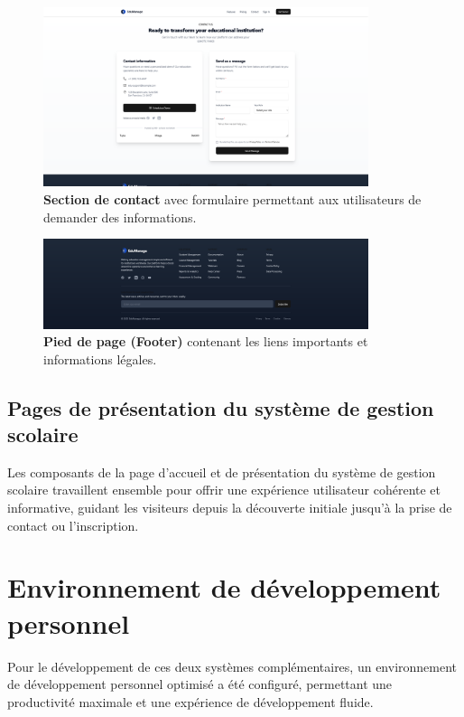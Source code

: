 \begin{figure}[H]
  \centering
  \includegraphics[width=0.85\textwidth,keepaspectratio]{pfe-pics/landing/contact.png}
  \caption{\textbf{Section de contact} avec formulaire permettant aux utilisateurs de demander des informations.}
  \label{fig:landing_contact}
\end{figure}

\begin{figure}[H]
  \centering
  \includegraphics[width=0.85\textwidth,keepaspectratio]{pfe-pics/landing/fotter.png}
  \caption{\textbf{Pied de page (Footer)} contenant les liens importants et informations légales.}
  \label{fig:landing_footer}
\end{figure}

\subsection{Pages de présentation du système de gestion scolaire}

Les composants de la page d'accueil et de présentation du système de gestion scolaire travaillent ensemble pour offrir une expérience utilisateur cohérente et informative, guidant les visiteurs depuis la découverte initiale jusqu'à la prise de contact ou l'inscription.

\section{Environnement de développement personnel}

Pour le développement de ces deux systèmes complémentaires, un environnement de développement personnel optimisé a été configuré, permettant une productivité maximale et une expérience de développement fluide.

